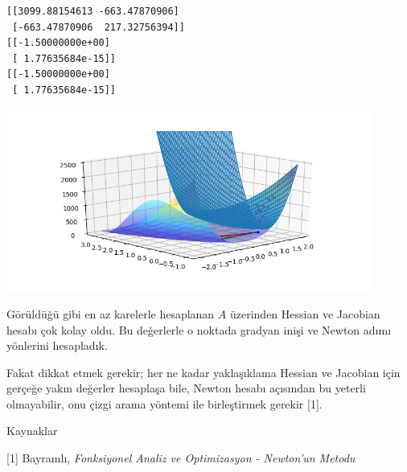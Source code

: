 \documentclass[12pt,fleqn]{article}\usepackage{../../common}
\begin{document}
\begin{verbatim}
[[3099.88154613 -663.47870906]
 [-663.47870906  217.32756394]]
[[-1.50000000e+00]
 [ 1.77635684e-15]]
[[-1.50000000e+00]
 [ 1.77635684e-15]]
\end{verbatim}

\includegraphics[height=6cm]{func_70_dfo_02.png}

Görüldüğü gibi en az karelerle hesaplanan $A$ üzerinden Hessian ve Jacobian
hesabı çok kolay oldu. Bu değerlerle o noktada gradyan inişi ve Newton
adımı yönlerini hesapladık. 

Fakat dikkat etmek gerekir; her ne kadar yaklaşıklama Hessian ve Jacobian
için gerçeğe yakın değerler hesaplaşa bile, Newton hesabı açısından bu
yeterli olmayabilir, onu çizgi arama yöntemi ile birleştirmek gerekir [1].

Kaynaklar

[1] Bayramlı, {\em Fonksiyonel Analiz ve Optimizasyon - Newton'un Metodu}
\end{document}
